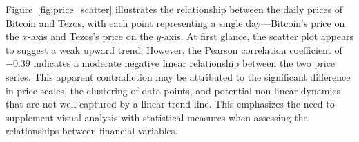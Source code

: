 Figure~\ref{fig:price_scatter} illustrates the relationship between the daily prices of Bitcoin and Tezos, with each point representing a single day—Bitcoin's price on the $x$-axis and Tezos's price on the $y$-axis.
 At first glance, the scatter plot appears to suggest a weak upward trend. However, the Pearson correlation coefficient of $-0.39$ indicates a moderate negative linear relationship between the two price series. 
 This apparent contradiction may be attributed to the significant difference in price scales, the clustering of data points, and potential non-linear dynamics that are not well captured by a linear trend line. 
 This emphasizes the need to supplement visual analysis with statistical measures when assessing the relationships between financial variables.